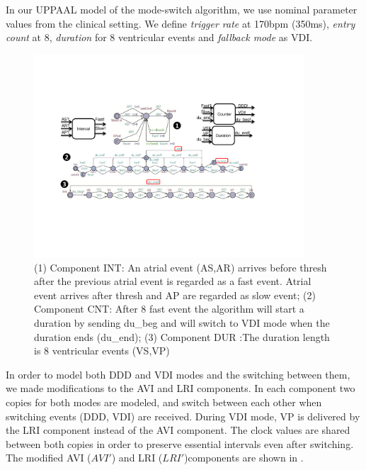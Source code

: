 In our UPPAAL model of the mode-switch algorithm, we use nominal parameter values from the clinical setting. We define \emph{trigger rate} at 170bpm (350ms), \emph{entry count} at 8, \emph{duration} for 8 ventricular events and \emph{fallback mode} as VDI. 
\begin{figure}
		\centering
		\includegraphics[width=0.9\textwidth]{figs/duration.pdf}
		\caption{\small (1) Component \textsf{INT}: An atrial event (\textsf{AS,AR}) arrives before \textsf{thresh} after the previous atrial event is regarded as a \textsf{fast} event. Atrial event arrives after \textsf{thresh} and \textsf{AP} are regarded as \textsf{slow} event; (2) Component \textsf{CNT}: After 8 \textsf{fast} event the algorithm will start a duration by sending \textsf{du\_beg} and will switch to \textsf{VDI} mode when the duration ends (\textsf{du\_end}); (3) Component \textsf{DUR} :The duration length is 8 ventricular events (\textsf{VS,VP})}
		\label{fig:dur_count}
\end{figure} 

In order to model both DDD and VDI modes and the switching between them, we made modifications to the AVI and LRI components.
In each component two copies for both modes are modeled, and switch between each other when switching events (DDD, VDI) are received. During VDI mode, \textsf{VP} is delivered by the LRI component instead of the AVI component. The clock values are shared between both copies in order to preserve essential intervals even after switching. The modified AVI ($AVI'$) and LRI ($LRI'$)components are shown in . 

